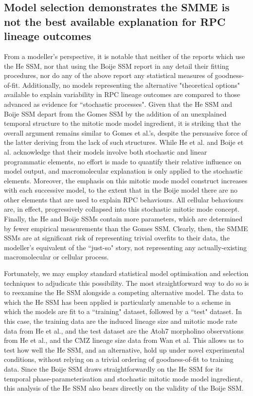  \subsection{Model selection demonstrates the SMME is not the best available explanation for RPC lineage outcomes}
 
From a modeller's perspective, it is notable that neither of the reports which use the He SSM\cite{He2012,Wan2016}, nor that using the Boije SSM\cite{Boije2015} report in any detail their fitting procedures, nor do any of the above report any statistical measures of goodness-of-fit. Additionally, no models representing the alternative "theoretical options" available to explain variability in RPC lineage outcomes are compared to those advanced as evidence for ``stochastic processes". Given that the He SSM and Boije SSM  depart from the Gomes SSM by the addition of an unexplained temporal structure to the mitotic mode model ingredient, it is striking that the overall argument remains similar to Gomes et al.'s, despite the persuasive force of the latter deriving from the lack of such structures. While He et al. and Boije et al. acknowledge that their models involve both stochastic and linear programmatic elements, no effort is made to quantify their relative influence on model output, and macromolecular explanation is only applied to the stochastic elements. Moreover, the emphasis on this mitotic mode model construct increases with each successive model, to the extent that in the Boije model there are no other elements that are used to explain RPC behaviours. All cellular behaviours are, in effect, progressively collapsed into this stochastic mitotic mode concept. Finally, the He and Boije SSMs contain more parameters, which are determined by fewer empirical measurements than the Gomes SSM. Clearly, then, the SMME SSMs are at significant risk of representing trivial overfits to their data, the modeller's equivalent of the ``just-so" story, not representing any actually-existing macromolecular or cellular process.

Fortunately, we may employ standard statistical model optimisation and selection techniques to adjudicate this possibility. The most straightforward way to do so is to reexamine the He SSM alongside a competing alternative model. The data to which the He SSM has been applied is particularly amenable to a scheme in which the models are fit to a ``training" dataset, followed by a ``test" dataset. In this case, the training data are the induced lineage size and mitotic mode rate data from He et al., and the test dataset are the Atoh7 morpholino observations from He et al., and the CMZ lineage size data from Wan et al. This allows us to test how well the He SSM, and an alternative, hold up under novel experimental conditions, without relying on a trivial ordering of goodness-of-fit to training data. Since the Boije SSM draws straightforwardly on the He SSM for its temporal phase-parameterisation and stochastic mitotic mode model ingredient, this analysis of the He SSM also bears directly on the validity of the Boije SSM.

